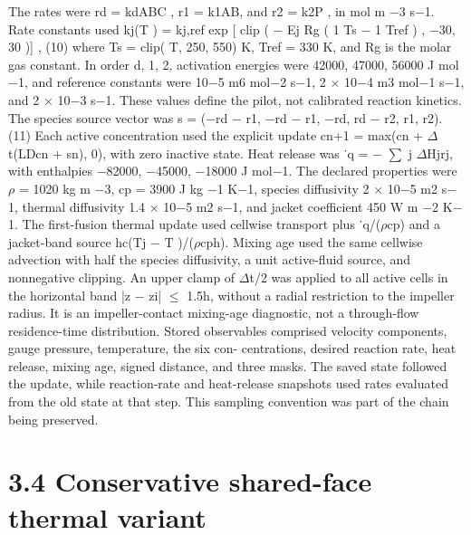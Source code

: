 \documentclass[11pt]{article}
\begin{document}
The rates were rd = kdABC , r1 = k1AB, and r2 = k2P , in mol m \ensuremath{-}3 s\ensuremath{-}1. Rate constants used
kj(T ) = kj,ref exp
[
clip
(
\ensuremath{-} Ej
Rg
( 1
Ts
\ensuremath{-} 1
Tref
)
, \ensuremath{-}30, 30
)]
, (10)
where Ts = clip( T, 250, 550) K, Tref = 330 K, and Rg is the molar gas constant. In order d, 1, 2,
activation energies were 42000, 47000, 56000 J mol \ensuremath{-}1, and reference constants were 10\ensuremath{-}5 m6 mol\ensuremath{-}2
s\ensuremath{-}1, 2 \ensuremath{\times} 10\ensuremath{-}4 m3 mol\ensuremath{-}1 s\ensuremath{-}1, and 2 \ensuremath{\times} 10\ensuremath{-}3 s\ensuremath{-}1. These values define the pilot, not calibrated reaction
kinetics.
The species source vector was
s = (\ensuremath{-}rd \ensuremath{-} r1, \ensuremath{-}rd \ensuremath{-} r1, \ensuremath{-}rd, rd \ensuremath{-} r2, r1, r2). (11)
Each active concentration used the explicit update cn+1 = max(cn + \ensuremath{\Delta}t(LDcn + sn), 0), with zero
inactive state. Heat release was ˙q = \ensuremath{-} \ensuremath{\sum}
j \ensuremath{\Delta}Hjrj, with enthalpies \ensuremath{-}82000, \ensuremath{-}45000, \ensuremath{-}18000 J mol\ensuremath{-}1.
The declared properties were \ensuremath{\rho} = 1020 kg m \ensuremath{-}3, cp = 3900 J kg \ensuremath{-}1 K\ensuremath{-}1, species diffusivity 2 \ensuremath{\times} 10\ensuremath{-}5
m2 s\ensuremath{-}1, thermal diffusivity 1.4 \ensuremath{\times} 10\ensuremath{-}5 m2 s\ensuremath{-}1, and jacket coefficient 450 W m \ensuremath{-}2 K\ensuremath{-}1.
The first-fusion thermal update used cellwise transport plus ˙q/(\ensuremath{\rho}cp) and a jacket-band source
hc(Tj \ensuremath{-} T )/(\ensuremath{\rho}cph). Mixing age used the same cellwise advection with half the species diffusivity,
a unit active-fluid source, and nonnegative clipping. An upper clamp of \ensuremath{\Delta}t/2 was applied to all
active cells in the horizontal band |z \ensuremath{-} zi| \ensuremath{\leq} 1.5h, without a radial restriction to the impeller radius.
It is an impeller-contact mixing-age diagnostic, not a through-flow residence-time distribution.
Stored observables comprised velocity components, gauge pressure, temperature, the six con-
centrations, desired reaction rate, heat release, mixing age, signed distance, and three masks. The
saved state followed the update, while reaction-rate and heat-release snapshots used rates evaluated
from the old state at that step. This sampling convention was part of the chain being preserved.

\section*{3.4 Conservative shared-face thermal variant}
\end{document}
